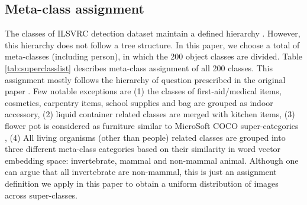 \documentclass[runningheads]{llncs}
\begin{document}
\subsection{Meta-class assignment} \label{sec:metaclass}

The classes of ILSVRC detection dataset maintain a defined hierarchy \cite{ILSVRC_2015}. However, this hierarchy does not follow a tree structure. In this paper, we choose a total of  meta-classes (including person), in which the 200 object classes are divided. Table \ref{tab:superclasslist} describes meta-class assignment of all 200 classes. This assignment mostly follows the hierarchy of question prescribed in the original paper \cite{ILSVRC_2015}. Few notable exceptions are (1) the classes of first-aid/medical items, cosmetics, carpentry items, school supplies and bag are grouped as indoor accessory, (2) liquid container related classes are merged with kitchen items, (3) flower pot is considered as furniture similar to MicroSoft COCO super-categories \cite{MSCOCO_2014}, (4) All living organisms (other than people) related classes are grouped into three different meta-class categories based on their similarity in word vector embedding space: invertebrate, mammal and non-mammal animal. Although one can argue that all invertebrate are non-mammal, this is just an assignment definition we apply in this paper to obtain a uniform distribution of images across super-classes.
\end{document}
